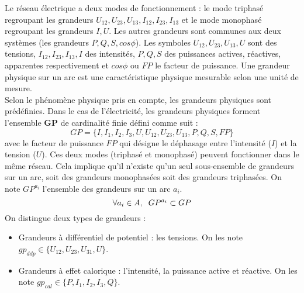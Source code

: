Le r\'eseau \'electrique a deux modes de fonctionnement : le mode triphas\'e regroupant les grandeurs $U_{12}, U_{23}, U_{13}, I_{12}, I_{23}, I_{13}$ et le mode monophas\'e regroupant les grandeurs $I,U$. Les autres grandeurs sont communes aux deux syst\`emes (les grandeurs $P, Q, S, cos \phi$). Les symboles
  $U_{12}, U_{23}, U_{13}, U$ sont des tensions,
  $I_{12}, I_{23}, I_{13}, I$ des intensit\'es, 
  $P, Q, S$ des puissances actives, r\'eactives, apparentes respectivement et 
  $cos \phi$ ou $FP$ le facteur de puissance.
\newline 
Une grandeur physique sur un arc est une caract\'eristique physique mesurable selon une unit\'e de mesure. \\
Selon le ph\'enom\`ene physique pris en compte, les grandeurs physiques sont pr\'ed\'efinies. Dans le cas de l'\'electricit\'e, les grandeurs physiques forment l'ensemble \textbf{GP} de cardinalit\'e finie d\'efini comme suit :
\begin{equation}
	GP = \{I, I_{1}, I_{2}, I_{3}, U, U_{12}, U_{23}, U_{13}, P, Q, S, FP \}
\end{equation}
avec le facteur de puissance $FP$ qui d\'esigne le d\'ephasage entre l'intensit\'e ($I$) et la tension ($U$).
\newline
Ces deux modes (triphas\'e et monophas\'e) peuvent fonctionner dans le m\^eme r\'eseau. Cela implique qu'il n'existe qu'un seul sous-ensemble de grandeurs sur un arc, soit des grandeurs monophas\'ees soit des grandeurs triphas\'ees. On note $GP^{a_{i}}$ l'ensemble des grandeurs sur un arc $a_{i} $.
\begin{equation}
	\forall a_{i} \in A, \hspace{0.2cm}  GP^{a_{i}} \subset GP
\end{equation}
On distingue deux types de grandeurs :
\begin{itemize}
	\item Grandeurs \`a diff\'erentiel de potentiel : les tensions. On les note $gp_{ddp} \in \{U_{12}, U_{23}, U_{31}, U\}$.
	\item Grandeurs \`a effet calorique :  l'intensit\'e, la puissance active et r\'eactive. On les note $gp_{cal} \in \{ P, I_{1}, I_{2}, I_{3}, Q\}$.
\end{itemize} 
